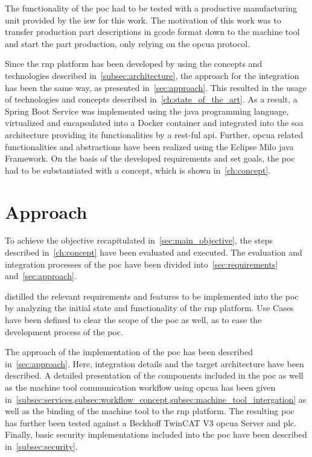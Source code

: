 \documentclass[
a4paper,
twoside,
headsepline,
cleardoublepage=empty,
parskip=half,
draft=false
]{scrbook}
\begin{document}
			The functionality of the \gls{poc} had to be tested with a productive manufacturing unit provided by the \gls{isw} for this work.
			The motivation of this work was to transfer production part descriptions in \gls{gcode} format down to the machine tool and start the part production, only relying on the \gls{opcua} protocol.
			
			Since the \gls{rnp} platform has been developed by using the concepts and technologies described in~\cref{subsec:architecture}, the approach for the integration has been the same way, as presented in~\cref{sec:approach}. This resulted in the usage of technologies and concepts described in~\cref{ch:state_of_the_art}. As a result, a Spring Boot Service was implemented using the \gls{java} programming language, virtualized and encapsulated into a Docker container and integrated into the \gls{soa} architecture providing its functionalities by a \gls{rest}-ful \gls{api}. Further, \gls{opcua} related functionalities and abstractions have been realized using the Eclipse Milo \gls{java} Framework. 
			On the basis of the developed requirements and set goals, the \gls{poc} had to be substantiated with a concept, which is shown in~\cref{ch:concept}.
		
		\section{Approach}\label{sec:discussion_approach}
		
			To achieve the objective recapitulated in~\cref{sec:main_objective}, the steps described in~\cref{ch:concept} have been evaluated and executed. The evaluation and integration processes of the \gls{poc} have been divided into~\cref{sec:requirements} and~\cref{sec:approach}.
			
			 distilled the relevant requirements and features to be implemented into the \gls{poc} by analyzing the initial state and functionality of the \gls{rnp} platform. Use Cases have been defined to clear the scope of the \gls{poc} as well, as to ease the development process of the \gls{poc}.
			
			The approach of the implementation of the \gls{poc} has been described in~\cref{sec:approach}. Here, integration details and the target architecture have been described. A detailed presentation of the components included in the \gls{poc} as well as the machine tool communication workflow using \gls{opcua} has been given in~\cref{subsec:services,subsec:workflow_concept,subsec:machine_tool_intergation} as well as the binding of the machine tool to the \gls{rnp} platform. 
			The resulting \gls{poc} has further been tested against a Beckhoff TwinCAT V3 \gls{opcua} Server and \gls{plc}.
			Finally, basic security implementations included into the \gls{poc} have been described in~\cref{subsec:security}.
			
\end{document}

